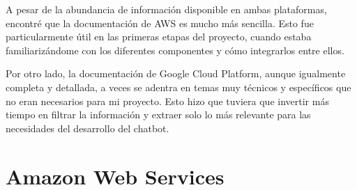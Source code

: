 A pesar de la abundancia de información disponible en ambas plataformas, encontré que la documentación de AWS es mucho más sencilla. Esto fue particularmente útil en las primeras etapas del proyecto, cuando estaba familiarizándome con los diferentes componentes y cómo integrarlos entre ellos.

Por otro lado, la documentación de Google Cloud Platform, aunque igualmente completa y detallada, a veces se adentra en temas muy técnicos y específicos que no eran necesarios para mi proyecto. Esto hizo que tuviera que invertir más tiempo en filtrar la información y extraer solo lo más relevante para las necesidades del desarrollo del chatbot.

\newpage
\section{Amazon Web Services}\label{AWS}

